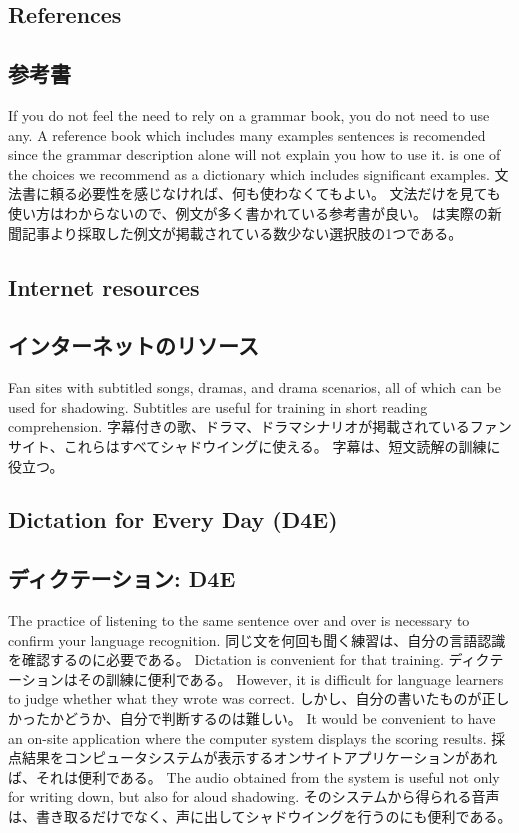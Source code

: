 \documentclass[uplatex,dvipdfmx,b5paper,english,10pt]{jsbook}
\begin{document}
\ifEnglish
\subsection{References}
\else
\subsection{参考書}
\fi

\ifEnglish
If you do not feel the need to rely on a grammar book, you do not need to use any.
A reference book which includes many examples sentences is recomended since the grammar description alone will not explain you how to use it.
\cite{Kaiser_Butler200103} is one of the choices we recommend as a dictionary which includes significant examples.
\else
文法書に頼る必要性を感じなければ、何も使わなくてもよい。
文法だけを見ても使い方はわからないので、例文が多く書かれている参考書が良い。
\cite{Kaiser_Butler200103}は実際の新聞記事より採取した例文が掲載されている数少ない選択肢の1つである。
\fi

\ifEnglish
\subsection{Internet resources}
\else
\subsection{インターネットのリソース}
\fi

\ifEnglish
Fan sites with subtitled songs, dramas, and drama scenarios, all of which can be used for shadowing.
Subtitles are useful for training in short reading comprehension.
\else
字幕付きの歌、ドラマ、ドラマシナリオが掲載されているファンサイト、これらはすべてシャドウイングに使える。
字幕は、短文読解の訓練に役立つ。
\fi

\ifEnglish
\subsection{Dictation for Every Day (D4E)}
\else
\subsection{ディクテーション: D4E}
\fi

\ifEnglish
The practice of listening to the same sentence over and over is necessary to confirm your language recognition.
\else
同じ文を何回も聞く練習は、自分の言語認識を確認するのに必要である。
\fi
\ifEnglish
Dictation is convenient for that training.
\else
ディクテーションはその訓練に便利である。
\fi
\ifEnglish
However, it is difficult for language learners to judge whether what they wrote was correct.
\else
しかし、自分の書いたものが正しかったかどうか、自分で判断するのは難しい。
\fi
\ifEnglish
It would be convenient to have an on-site application where the computer system displays the scoring results.
\else
採点結果をコンピュータシステムが表示するオンサイトアプリケーションがあれば、それは便利である。
\fi
\ifEnglish
The audio obtained from the system is useful not only for writing down, but also for aloud shadowing.
\else
そのシステムから得られる音声は、書き取るだけでなく、声に出してシャドウイングを行うのにも便利である。
\fi
\end{document}

